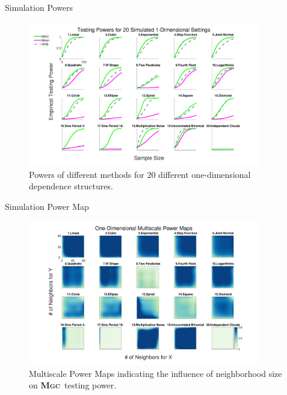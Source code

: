 \documentclass{beamer}
\providecommand{\sct}[1]{{\normalfont\textsc{#1}}}
\newcommand{\Mgc}{\textbf{\sct{Mgc}}}
\begin{document}
\begin{frame}{Simulation Powers}
\begin{figure}[htbp]
\includegraphics[width=0.9\textwidth]{../Figures/Fig1DPower}
\caption{
Powers of different methods for $20$ different one-dimensional dependence structures.}
\end{figure}
\end{frame}

\begin{frame}{Simulation Power Map}
\begin{figure}[htbp]
\includegraphics[width=0.9\textwidth]{../Figures/Fig1DHeat}
\caption{
Multiscale Power Maps indicating the influence of neighborhood size on \Mgc~testing power.}
\end{figure}
\end{frame}
\end{document}
